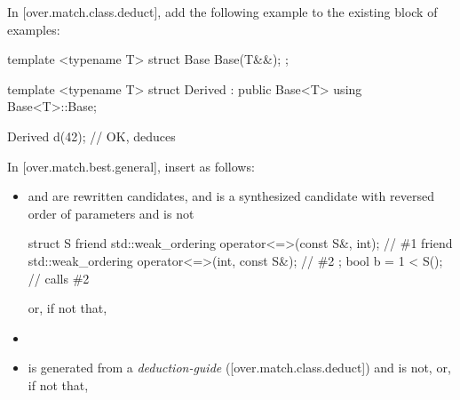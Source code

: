 In [over.match.class.deduct], add the following example to the existing block of examples:

\begin{adjustwidth}{0.5cm}{0.5cm}
\begin{addedblock}
\begin{example}
\begin{codeblock}
template <typename T> struct Base {
  Base(T&&);
};

template <typename T> struct Derived : public Base<T> {
  using Base<T>::Base;
}

Derived d(42);  // OK, deduces 
\end{codeblock}
\end{example}
\end{addedblock}
\end{adjustwidth}

In [over.match.best.general], insert as follows:

\begin{adjustwidth}{0cm}{0.5cm}
\begin{itemize}
\item
{} and  are rewritten candidates, and
 is a synthesized candidate
with reversed order of parameters
and  is not
\begin{example}
\begin{codeblock}
struct S {
  friend std::weak_ordering operator<=>(const S&, int);         // \#1
  friend std::weak_ordering operator<=>(int, const S&);         // \#2
};
bool b = 1 < S();                                               // calls \#2
\end{codeblock}
\end{example}
or, if not that,


\item {}

\item
{} is generated from a
\emph{deduction-guide} ([over.match.class.deduct])
and  is not, or, if not that,
\end{itemize}
\end{adjustwidth}


\renewcommand{\bibname}{References}



